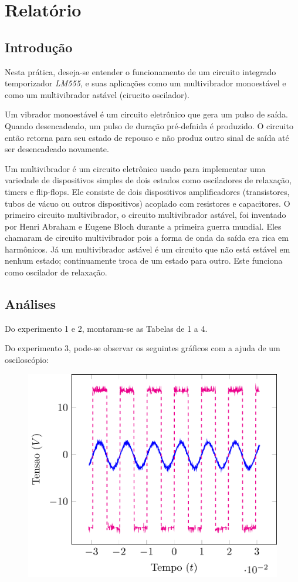\documentclass[12pt,a4paper]{article}
\begin{document}
\setcounter{figure}{4}
\setcounter{section}{3}
\setcounter{page}{5}
\section{Relatório}
\subsection{Introdução}

Nesta prática, deseja-se entender o funcionamento de um circuito integrado temporizador \emph{LM555}, e suas aplicações como um multivibrador monoestável e como um multivibrador astável (cirucito oscilador). 

Um vibrador monoestável é um circuito eletrônico que gera um pulso de saída. Quando desencadeado, um pulso de duração pré-defnida é produzido. O circuito então retorna para seu estado de repouso e não produz outro sinal de saída até ser desencadeado novamente.

Um multivibrador é um circuito eletrônico usado para implementar uma variedade de dispositivos simples de dois estados como osciladores de relaxação, timers e flip-flops. Ele consiste de dois dispositivos amplificadores (transistores, tubos de vácuo ou outros dispositivos) acoplado com resistores e capacitores. O primeiro circuito multivibrador, o circuito multivibrador astável, foi inventado por Henri Abraham e Eugene Bloch durante a primeira guerra mundial. Eles chamaram de circuito multivibrador pois a forma de onda da saída era rica em harmônicos. Já um multivibrador astável é um circuito que não está estável em nenhum estado; continuamente troca de um estado para outro. Este funciona como oscilador de relaxação.




\subsection{Análises}
Do experimento 1 e 2, montaram-se as Tabelas de 1 a 4.

Do experimento 3, pode-se observar os seguintes gráficos com a ajuda de um osciloscópio:
\begin{figure}[htpb]
  \centering
  \includegraphics[width=0.8\linewidth]{./img/5V_100.pdf}
  \label{5V100}
\end{figure}
\end{document}
